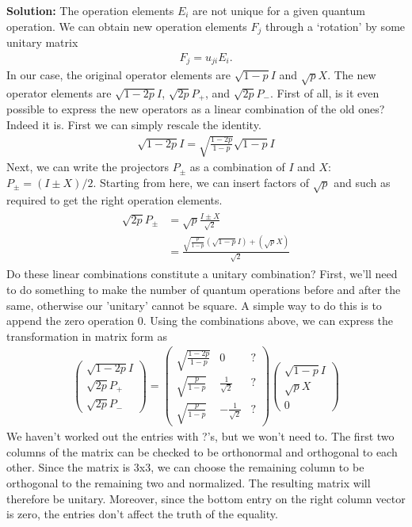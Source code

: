 \documentclass{book}
\begin{document}
    \textbf{Solution:} The operation elements $E_i$ are not unique for a given quantum operation. We can obtain new operation elements $F_j$ through a `rotation' by some unitary matrix
    \begin{align}
        F_j = u_{ji} E_i.
    \end{align}
    In our case, the original operator elements are $\sqrt{1-p}I$ and $\sqrt{p}X$. The new operator elements are $\sqrt{1-2p}I$, $\sqrt{2p}P_+$, and $\sqrt{2p}P_-$. First of all, is it even possible to express the new operators as a linear combination of the old ones? Indeed it is. First we can simply rescale the identity.
    \begin{align}
        \sqrt{1-2p}I = \sqrt{\frac{1-2p}{1-p}} \sqrt{1-p}I
    \end{align}
    Next, we can write the projectors $P_\pm$ as a combination of $I$ and $X$: $P_\pm = (I\pm X)/2$. Starting from here, we can insert factors of $\sqrt{p}$ and such as required to get the right operation elements.
    \begin{align}
    \begin{aligned}
        \sqrt{2p}P_\pm &= \sqrt{p} \frac{I\pm X}{\sqrt{2}} \\
        &= \frac{\sqrt{\frac{p}{1-p}} \left(\sqrt{1-p}I\right) + \left(\sqrt{p} X\right)}{\sqrt{2}}
    \end{aligned}
    \end{align}
    Do these linear combinations constitute a unitary combination? First, we'll need to do something to make the number of quantum operations before and after the same, otherwise our 'unitary' cannot be square. A simple way to do this is to append the zero operation 0. Using the combinations above, we can express the transformation in matrix form as
    \begin{align}
        \begin{pmatrix}
            \sqrt{1-2p} I \\
            \sqrt{2p}P_+ \\
            \sqrt{2p}P_- 
        \end{pmatrix}
        =
        \begin{pmatrix}
            \sqrt{\frac{1-2p}{1-p}} & 0 & ? \\
            \sqrt{\frac{p}{1-p}} & \frac{1}{\sqrt{2}} & ? \\
            \sqrt{\frac{p}{1-p}} & -\frac{1}{\sqrt{2}} & ?
        \end{pmatrix}
        \begin{pmatrix}
            \sqrt{1-p}I \\
            \sqrt{p} X \\
            0
        \end{pmatrix}
    \end{align}
    We haven't worked out the entries with ?'s, but we won't need to. The first two columns of the matrix can be checked to be orthonormal and orthogonal to each other. Since the matrix is 3x3, we can choose the remaining column to be orthogonal to the remaining two and normalized. The resulting matrix will therefore be unitary. Moreover, since the bottom entry on the right column vector is zero, the entries don't affect the truth of the equality. 
    
\end{document}
